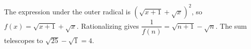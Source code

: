 The expression under the outer radical is $(\sqrt{x+1}+\sqrt x)^2$, so $f(x)=\sqrt{x+1}+\sqrt x$. Rationalizing gives $\dfrac{1}{f(n)}=\sqrt{n+1}-\sqrt n$. The sum telescopes to $\sqrt{25}-\sqrt1=\boxed4$.
